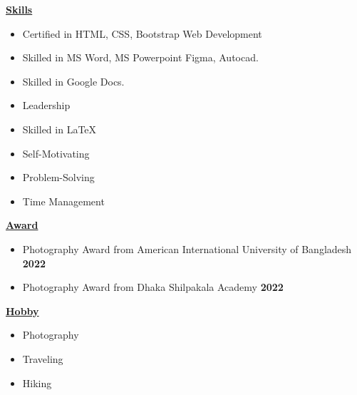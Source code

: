 \documentclass[12pt]{article}
\begin{document}
	\begin{large}
		\underline {\textbf{Skills}} 
	\end{large}
	
	\begin{itemize}
		\item Certified in HTML, CSS, Bootstrap Web Development
		\item Skilled in MS Word, MS Powerpoint Figma, Autocad.
		\item Skilled in Google Docs.
		\item Leadership
		\item Skilled in LaTeX
		\item Self-Motivating
		\item Problem-Solving
		\item Time Management
	\end{itemize}
	
	\begin{large}
		\underline {\textbf{Award}} 
	\end{large}
	
	\begin{itemize}
		\item Photography Award from American International University of Bangladesh \hfill \textbf{2022}
		\item Photography Award from Dhaka Shilpakala Academy \hfill \textbf{2022}
		
	\end{itemize}
	
	\begin{large}
		\underline {\textbf{Hobby}} 
	\end{large}
	
	\begin{itemize}
		\item Photography
		\item Traveling
		\item Hiking
		
	\end{itemize}
	
	
\end{document}

